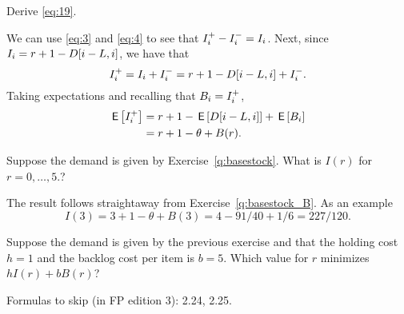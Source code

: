 \begin{exercise}
Derive \eqref{eq:19}. 
\begin{solution} We can use \eqref{eq:3} and \eqref{eq:4} to see that $I_i^+ - I_i^- = I_i$. Next, since $I_i = r+1 - D[i-L, i]$, we have that 
  \begin{equation*}
    I_i^+ = I_i + I_i^-=r+1 - D[i-L, i] + I_i^-.
  \end{equation*}
Taking expectations and recalling that $B_i = I_i^+$,
\begin{align*}
  \,\mathsf{E}\left[I_i^+\right]
  &= r+1 - \,\mathsf{E}\left[D[i-L, i]\right] + \,\mathsf{E}\left[B_i\right]  \\
  & = r + 1 - \theta + B(r).
\end{align*}
\end{solution}
\end{exercise}

\begin{exercise}
Suppose the demand is given by Exercise~\ref{q:basestock}. What is $I(r)$ for $r=0,\ldots, 5$.?

\begin{solution}
 The result follows straightaway from Exercise~\ref{q:basestock_B}. As an example
  \begin{equation*}
    I(3) = 3+1 - \theta + B(3) = 4 - 91/40 + 1/6 = 227/120.
  \end{equation*}
\end{solution}
\end{exercise}

\begin{exercise}
Suppose the demand is given by the previous exercise and that the holding cost $h=1$ and the backlog cost per item is $b=5$.  Which value for $r$ minimizes $h I(r)+b B(r)$?
\end{exercise}

 Formulas to skip (in FP edition 3): 2.24, 2.25. 



\clearpage


